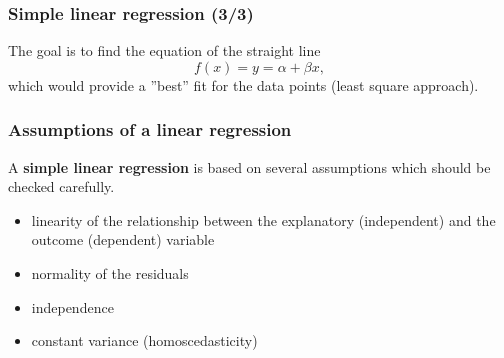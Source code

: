 \documentclass{beamer}\usepackage[]{graphicx}\usepackage[]{color}
\begin{document}
{{{%

\usebackgroundtemplate{}
\begin{frame}
\frametitle{Simple linear regression (3/3)}
The goal is to find the equation of the straight line
\begin{equation}
f(x) = y = \alpha + \beta x, \nonumber
\end{equation}
which would provide a ''best'' fit for the data points (least square approach).
\end{frame}


\usebackgroundtemplate{}
\begin{frame}
\frametitle{Assumptions of a linear regression}
A {\bfseries simple linear regression} is based on several assumptions which
should be checked carefully.
\begin{itemize}
\item linearity of the relationship between the explanatory (independent)
and the outcome (dependent) variable
\item normality of the residuals
\item independence
\item constant variance (homoscedasticity)
\end{itemize}
\end{frame}


}}}
\end{document}
